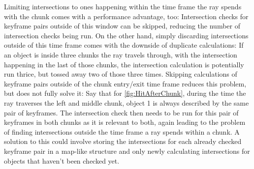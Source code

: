 \newline
Limiting intersections to ones happening within the time frame the ray spends with the chunk comes with a performance advantage, too:
Intersection checks for keyframe pairs outside of this window can be skipped,
reducing the number of intersection checks being run.
\newline
On the other hand, simply discarding intersections outside of this time frame comes with the downside of duplicate calculations:
If an object is inside three chunks the ray travels through, with the intersection happening in the last of those chunks,
the intersection calculation is potentially run thrice, but tossed away two of those three times.
\newline
Skipping calculations of keyframe pairs outside of the chunk entry/exit time frame reduces this problem,
but does not fully solve it:
Say that for \autoref{fig:HitAfterChunk}, during the time the ray traverses the left and middle chunk,
object 1 is always described by the same pair of keyframes.
The intersection check then needs to be run for this pair of keyframes in both chunks
as it is relevant to both, again leading to the problem of finding intersections outside the time frame a ray spends within a chunk.
\newline
A solution to this could involve storing the intersections for each already checked keyframe pair in a map-like structure
and only newly calculating intersections for objects that haven't been checked yet.
